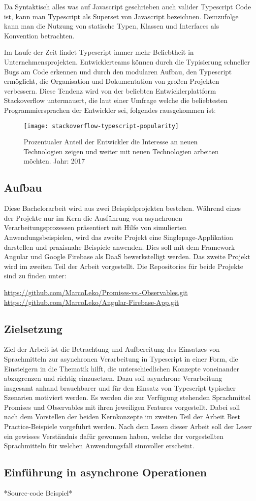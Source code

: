 Da Syntaktisch alles was auf Javascript geschrieben auch valider Typescript Code ist, kann man Typescript als Superset von Javascript bezeichnen. Demzufolge kann man die Nutzung von statische Typen, Klassen und Interfaces als Konvention betrachten.

Im Laufe der Zeit findet Typescript immer mehr Beliebtheit in Unternehmensprojekten. Entwicklerteams können durch die Typisierung schneller Bugs am Code erkennen und durch den modularen Aufbau, den Typescript ermöglicht, die Organisation und Dokumentation von großen Projekten verbessern. Diese Tendenz wird von der beliebten Entwicklerplattform Stackoverflow untermauert, die laut einer Umfrage welche die beliebtesten Programmiersprachen der Entwickler sei, folgendes rausgekommen ist:

\begin{figure}[H]
\centering
\texttt{[image: stackoverflow-typescript-popularity]}
\caption{Prozentualer Anteil der Entwickler die Interesse an neuen Technologien zeigen und weiter mit neuen Technologien arbeiten möchten. Jahr: 2017 \cite{typescript-survey}}
\end{figure}

\subsection{Aufbau}
Diese Bachelorarbeit wird aus zwei Beispielprojekten bestehen. Während eines der Projekte nur im Kern die Ausführung von asynchronen Verarbeitungsprozessen präsentiert mit Hilfe von simulierten Anwendungsbeispielen, wird das zweite Projekt eine Singlepage-Applikation darstellen und praxisnahe Beispiele anwenden. Dies soll mit dem Framework Angular und Google Firebase als DaaS bewerkstelligt werden. Das zweite Projekt wird im zweiten Teil der Arbeit vorgestellt. Die Repositories für beide Projekte sind zu finden unter: 

\begin{center}
\url{https://github.com/MarcoLeko/Promises-vs.-Observables.git} \\
\url{https://github.com/MarcoLeko/Angular-Firebase-App.git}
\end{center}

\subsection{Zielsetzung}
Ziel der Arbeit ist die Betrachtung und Aufbereitung des Einsatzes von Sprachmitteln zur asynchronen Verarbeitung in Typescript in einer Form, die Einsteigern in die Thematik hilft, die unterschiedlichen Konzepte voneinander abzugrenzen und richtig einzusetzen. Dazu soll asynchrone Verarbeitung insgesamt anhand brauchbarer und für den Einsatz von Typescript typischer Szenarien motiviert werden. Es werden die zur Verfügung stehenden Sprachmittel Promises und Observables mit ihren jeweiligen Features vorgestellt. Dabei soll nach dem Vorstellen der beiden Kernkonzepte im zweiten Teil der Arbeit \glqq Best Practice\grqq{}-Beispiele vorgeführt werden. Nach dem Lesen dieser Arbeit soll der Leser ein gewisses Verständnis dafür gewonnen haben, welche der vorgestellten Sprachmitteln für welchen Anwendungsfall sinnvoller erscheint. 

\subsection{Einführung in asynchrone Operationen}
*Source-code Beispiel*